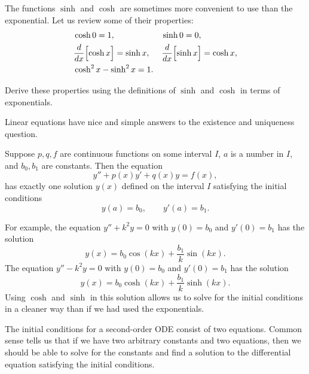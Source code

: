 The functions $\sinh$ and $\cosh$ are sometimes more convenient to use than the
exponential.  Let us review some of their properties:
\begin{align*}
& \cosh 0  = 1 , &   & \sinh 0 = 0 , \\
& \frac{d}{dx} \Bigl[ \cosh x \Bigr] = \sinh x , &  & \frac{d}{dx} \Bigl[ \sinh x \Bigr] = \cosh x , \\
& \cosh^2 x - \sinh^2 x = 1 .
\end{align*}


\begin{exercise}
Derive these properties using the definitions of $\sinh$
and $\cosh$ in terms of exponentials.
\end{exercise}


Linear equations have nice and simple
answers to the existence and uniqueness question.

\begin{theorem}
Suppose $p, q, f$ are continuous functions on some interval
$I$, $a$ is a number in $I$,
and $b_0, b_1$ are constants.
Then the equation
\begin{equation*}
y'' + p(x) y' + q(x) y = f(x) ,
\end{equation*}
has exactly one solution $y(x)$ defined on the interval $I$ satisfying the initial conditions
\begin{equation*}
y(a) = b_0 , \qquad y'(a) = b_1 .
\end{equation*}
\end{theorem}

For example, the equation $y'' + k^2 y = 0$ with $y(0) = b_0$ and $y'(0) = b_1$
has the solution
\begin{equation*}
y(x) = b_0 \cos (kx) + \frac{b_1}{k} \sin (kx) .
\end{equation*}
The equation $y'' - k^2 y = 0$ with $y(0) = b_0$ and $y'(0) = b_1$
has the solution
\begin{equation*}
y(x) = b_0 \cosh (kx) + \frac{b_1}{k} \sinh (kx) .
\end{equation*}
Using $\cosh$ and $\sinh$ in this solution allows us to solve for
the initial conditions
in a cleaner way
than if we had used the exponentials.

\medskip

The initial conditions for a second-order ODE consist of two
equations.  Common sense tells us that
if we have two arbitrary constants and two equations, then we should 
be able to solve
for the constants and find a solution to the differential equation
satisfying the initial conditions.

